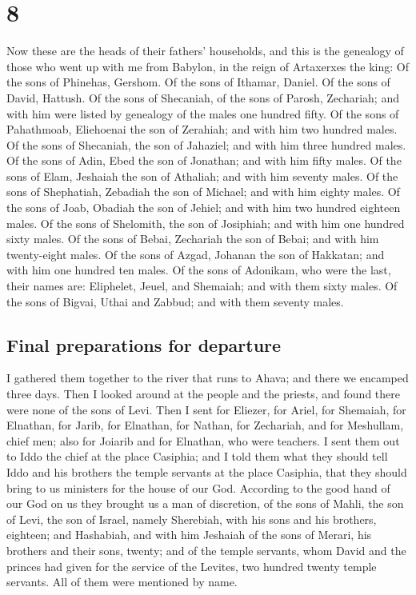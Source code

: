 \hypertarget{section-7}{%
\section{8}\label{section-7}}

 Now these are the heads of their fathers' households, and
this is the genealogy of those who went up with me from Babylon, in the
reign of Artaxerxes the king:  Of the sons of Phinehas,
Gershom. Of the sons of Ithamar, Daniel. Of the sons of David, Hattush.
 Of the sons of Shecaniah, of the sons of Parosh,
Zechariah; and with him were listed by genealogy of the males one
hundred fifty.  Of the sons of Pahathmoab, Eliehoenai the
son of Zerahiah; and with him two hundred males.  Of the
sons of Shecaniah, the son of Jahaziel; and with him three hundred
males.  Of the sons of Adin, Ebed the son of Jonathan; and
with him fifty males.  Of the sons of Elam, Jeshaiah the
son of Athaliah; and with him seventy males.  Of the sons
of Shephatiah, Zebadiah the son of Michael; and with him eighty males.
 Of the sons of Joab, Obadiah the son of Jehiel; and with
him two hundred eighteen males.  Of the sons of
Shelomith, the son of Josiphiah; and with him one hundred sixty males.
 Of the sons of Bebai, Zechariah the son of Bebai; and
with him twenty-eight males.  Of the sons of Azgad,
Johanan the son of Hakkatan; and with him one hundred ten males.
 Of the sons of Adonikam, who were the last, their names
are: Eliphelet, Jeuel, and Shemaiah; and with them sixty males.
 Of the sons of Bigvai, Uthai and Zabbud; and with them
seventy males.

\hypertarget{final-preparations-for-departure}{%
\subsection{Final preparations for
departure}\label{final-preparations-for-departure}}

 I gathered them together to the river that runs to
Ahava; and there we encamped three days. Then I looked around at the
people and the priests, and found there were none of the sons of Levi.
 Then I sent for Eliezer, for Ariel, for Shemaiah, for
Elnathan, for Jarib, for Elnathan, for Nathan, for Zechariah, and for
Meshullam, chief men; also for Joiarib and for Elnathan, who were
teachers.  I sent them out to Iddo the chief at the place
Casiphia; and I told them what they should tell Iddo and his brothers
the temple servants at the place Casiphia, that they should bring to us
ministers for the house of our God.  According to the
good hand of our God on us they brought us a man of discretion, of the
sons of Mahli, the son of Levi, the son of Israel, namely Sherebiah,
with his sons and his brothers, eighteen;  and Hashabiah,
and with him Jeshaiah of the sons of Merari, his brothers and their
sons, twenty;  and of the temple servants, whom David and
the princes had given for the service of the Levites, two hundred twenty
temple servants. All of them were mentioned by name.

